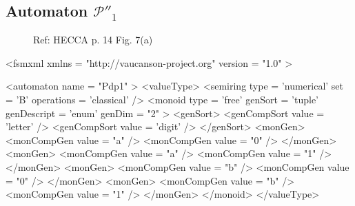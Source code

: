 \subsection{Automaton $\mathcal{P}''_1$}
\label{automatonPdp1}

\begin{figure}[h]
  \begin{minipage}[c]{.66\textwidth}
    Ref: HECCA p. 14 Fig. 7(a)
  \end{minipage}
  \begin{minipage}[c]{.34\textwidth}

  \end{minipage}
\end{figure}

{\footnotesize
\begin{listing}[5]{1}
<fsmxml  xmlns   = "http://vaucanson-project.org"
         version = "1.0" >

<automaton name = "Pdp1" >
  <valueType>
    <semiring  type       = 'numerical'
               set        = 'B'
               operations = 'classical' />
    <monoid    type       = 'free'
               genSort    = 'tuple'
               genDescript = 'enum'
	       genDim	  = "2" >
      <genSort>
         <genCompSort value = 'letter' />
         <genCompSort value = 'digit'  />
      </genSort>
      <monGen>
         <monCompGen value = "a" />
         <monCompGen value = "0" />
      </monGen>
      <monGen>
         <monCompGen value = "a" />
         <monCompGen value = "1" />
      </monGen>
      <monGen>
         <monCompGen value = "b" />
         <monCompGen value = "0" />
      </monGen>
      <monGen>
         <monCompGen value = "b" />
         <monCompGen value = "1" />
      </monGen>
    </monoid>
  </valueType>
\end{listing}
}

\newpage

